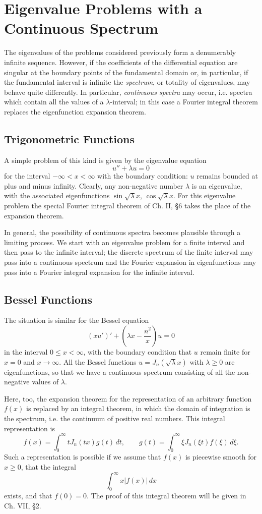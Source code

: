 \section{Eigenvalue Problems with a Continuous Spectrum}
The eigenvalues of the problems considered previously form a denumerably infinite sequence. However, if the coefficients of the differential equation are singular at the boundary points of the fundamental domain or, in particular, if the fundamental interval is infinite the \emph{spectrum}, or totality of eigenvalues, may behave quite differently. In particular, \emph{continuous spectra} may occur, i.e. spectra which contain all the values of a $\lambda$-interval; in this case a Fourier integral theorem replaces the eigenfunction expansion theorem.

\subsection{Trigonometric Functions}
A simple problem of this kind is given by the eigenvalue equation
\[
u''+\lambda u=0
\]
for the interval $-\infty<x<\infty$ with the boundary condition: $u$ remains bounded at plus and minus infinity. Clearly, any non-negative number $\lambda$ is an eigenvalue, with the associated eigenfunctions $\sin\sqrt\lambda x$, $\cos\sqrt\lambda x$. For this eigenvalue problem the special Fourier integral theorem of Ch. II, \S6 takes the place of the expansion theorem.

In general, the possibility of continuous spectra becomes plausible through a limiting process. We start with an eigenvalue problem for a finite interval and then pass to the infinite interval; the discrete spectrum of the finite interval may pass into a continuous spectrum and the Fourier expansion in eigenfunctions may pass into a Fourier integral expansion for the infinite interval.

\subsection{Bessel Functions}
The situation is similar for the Bessel equation
\[
(xu')'+\left(\lambda x-\frac{n^2}{x}\right)u=0
\]
in the interval $0\le x<\infty$, with the boundary condition that $u$ remain finite for $x=0$ and $x\to\infty$. All the Bessel functions $u=J_n(\sqrt\lambda x)$ with $\lambda\ge0$ are eigenfunctions, so that we have a continuous spectrum consisting of all the non-negative values of $\lambda$.

Here, too, the expansion theorem for the representation of an arbitrary function $f(x)$ is replaced by an integral theorem, in which the domain of integration is the spectrum, i.e. the continuum of positive real numbers. This integral representation is
\[
f(x)=\int_0^\infty tJ_n(tx)g(t)\,dt,\qquad g(t)=\int_0^\infty \xi J_n(\xi t)f(\xi)\,d\xi.
\]
Such a representation is possible if we assume that $f(x)$ is piecewise smooth for $x\ge0$, that the integral
\[
\int_0^\infty x|f(x)|\,dx
\]
exists, and that $f(0)=0$. The proof of this integral theorem will be given in Ch. VII, \S2.

